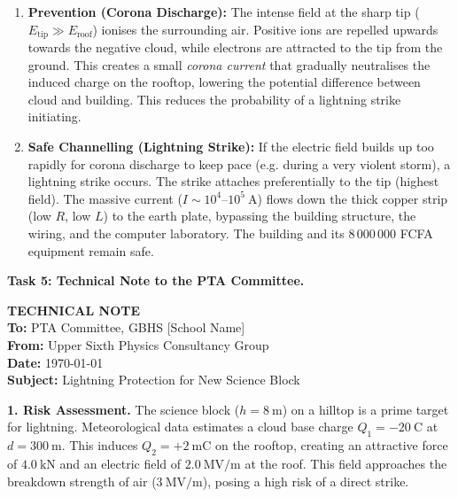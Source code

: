 \documentclass[11pt]{article}
\begin{document}
\begin{enumerate}
\item \textbf{Prevention (Corona Discharge):} The intense field at the sharp tip ($E_{\text{tip}} \gg E_{\text{roof}}$) ionises the surrounding air. Positive ions are repelled upwards towards the negative cloud, while electrons are attracted to the tip from the ground. This creates a small \emph{corona current} that gradually neutralises the induced charge on the rooftop, lowering the potential difference between cloud and building. This reduces the probability of a lightning strike initiating.
\item \textbf{Safe Channelling (Lightning Strike):} If the electric field builds up too rapidly for corona discharge to keep pace (e.g. during a very violent storm), a lightning strike occurs. The strike attaches preferentially to the tip (highest field). The massive current ($I \sim 10^4$--$10^5\ \mathrm{A}$) flows down the thick copper strip (low $R$, low $L$) to the earth plate, bypassing the building structure, the wiring, and the computer laboratory. The building and its $8\,000\,000$ FCFA equipment remain safe.
\end{enumerate}

\textbf{Task 5: Technical Note to the PTA Committee.}

\begin{center}
\textbf{\large TECHNICAL NOTE}\\[0.5em]
\textbf{To:} PTA Committee, GBHS [School Name]\\[0.2em]
\textbf{From:} Upper Sixth Physics Consultancy Group\\[0.2em]
\textbf{Date:} \today\\[0.2em]
\textbf{Subject:} Lightning Protection for New Science Block
\end{center}

\vspace{0.5em}
\noindent\textbf{1. Risk Assessment.}
The science block ($h=8\ \mathrm{m}$) on a hilltop is a prime target for lightning. Meteorological data estimates a cloud base charge $Q_1=-20\ \mathrm{C}$ at $d=300\ \mathrm{m}$. This induces $Q_2=+2\ \mathrm{mC}$ on the rooftop, creating an attractive force of $4.0\ \mathrm{kN}$ and an electric field of $2.0\ \mathrm{MV/m}$ at the roof. This field approaches the breakdown strength of air ($3\ \mathrm{MV/m}$), posing a high risk of a direct strike.
\end{document}
